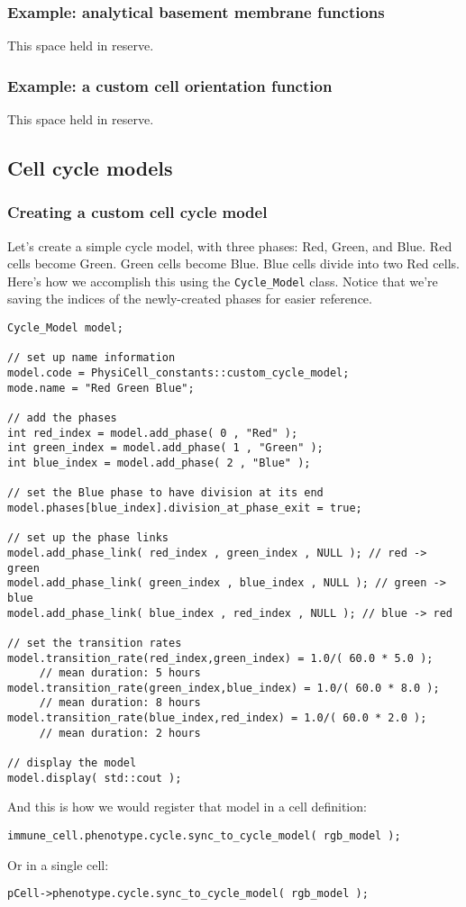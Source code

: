 \documentclass[12pt]{article}
\renewcommand{\v}{\verb}
\begin{document}
\subsubsection{Example: analytical basement membrane functions}
This space held in reserve. 

\subsubsection{Example: a custom cell orientation function}
This space held in reserve. 

\subsection{Cell cycle models}

\subsubsection{Creating a custom cell cycle model}
\label{sec:Examples:custom_cell_cycle}
Let's create a simple cycle model, with three phases: Red, Green, and Blue. 
Red cells become Green. Green cells become Blue. Blue cells divide into two 
Red cells. Here's how we accomplish this using the \v|Cycle_Model| class. 
Notice that we're saving the indices of the newly-created phases for 
easier reference. 

\begin{verbatim}
Cycle_Model model;

// set up name information 
model.code = PhysiCell_constants::custom_cycle_model;
mode.name = "Red Green Blue"; 

// add the phases 
int red_index = model.add_phase( 0 , "Red" ); 
int green_index = model.add_phase( 1 , "Green" ); 
int blue_index = model.add_phase( 2 , "Blue" ); 

// set the Blue phase to have division at its end 
model.phases[blue_index].division_at_phase_exit = true; 

// set up the phase links 
model.add_phase_link( red_index , green_index , NULL ); // red -> green
model.add_phase_link( green_index , blue_index , NULL ); // green -> blue
model.add_phase_link( blue_index , red_index , NULL ); // blue -> red 

// set the transition rates
model.transition_rate(red_index,green_index) = 1.0/( 60.0 * 5.0 ); 
     // mean duration: 5 hours
model.transition_rate(green_index,blue_index) = 1.0/( 60.0 * 8.0 ); 
     // mean duration: 8 hours
model.transition_rate(blue_index,red_index) = 1.0/( 60.0 * 2.0 ); 
     // mean duration: 2 hours

// display the model 
model.display( std::cout ); 
\end{verbatim}
And this is how we would register that model in a cell definition:
\begin{verbatim}
immune_cell.phenotype.cycle.sync_to_cycle_model( rgb_model ); 
\end{verbatim}
Or in a single cell: 
\begin{verbatim}
pCell->phenotype.cycle.sync_to_cycle_model( rgb_model ); 
\end{verbatim}
\end{document}
